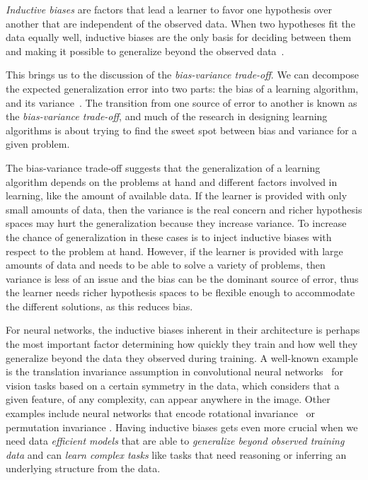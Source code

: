 \emph{Inductive biases} are factors that lead a learner to favor one hypothesis over another that are independent of the observed data. When two hypotheses fit the data equally well, inductive biases are the only basis for deciding between them and making it possible to generalize beyond the observed data~\citep{Mitchell80theneed}.

This brings us to the discussion of the \emph{bias-variance trade-off}.
We can decompose the expected generalization error into two parts: the
bias of a learning algorithm, and its variance~\citep{geman1992neural}. The transition from one source of error to another is known as the \emph{bias-variance trade-off}, and much of the research in designing learning algorithms is about trying to find the sweet spot between bias and variance for a given problem. 

The bias-variance trade-off suggests that the generalization of a learning algorithm depends on the problems at hand and different factors involved in learning, like the amount of available data. 
If the learner is provided with only small amounts of data, then the variance is the real concern and richer hypothesis spaces may hurt the generalization because they increase variance.  To increase the chance of generalization in these cases is to inject inductive biases with respect to the problem at hand.
However, if the learner is provided with large amounts of data and needs to be able to solve a variety of problems, then variance is less of an issue and the bias can be the dominant source of error, thus the learner needs richer hypothesis spaces to be flexible enough to accommodate the different solutions, as this reduces bias.

For neural networks, the inductive biases inherent in their architecture is perhaps the most important factor determining how quickly they train and how well they generalize beyond the data they observed during training. 
A well-known example is the translation invariance assumption in convolutional neural networks~\citep{lecun1989backpropagation} for vision tasks based on a certain symmetry in the data, which considers that a given feature, of any complexity, can appear anywhere in the image.   Other examples include neural networks that encode rotational invariance~\citep{cohen2016steerable} or permutation invariance \citep{zaheer2017deep, lee2018set}.
Having inductive biases gets even more crucial when we need data \emph{efficient models} that are able to \emph{generalize beyond observed training data} and can \emph{learn complex tasks} like tasks that need reasoning or inferring an underlying structure from the data.

